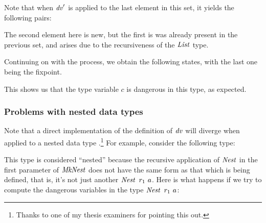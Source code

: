 Note that when $\operatorname{\mathit{dv}}'$ is applied to the last element in this set, it yields the following pairs:


The second element here is new, but the first is was already present in the previous set, and arises due to the recursiveness of the $\operatorname{\mathit{List}}$ type.

Continuing on with the process, we obtain the following states, with the last one being the fixpoint.


This shows us that the type variable $c$ is dangerous in this type, as expected.


\clearpage{}
\subsubsection{Problems with nested data types}
Note that a direct implementation of the definition of $\operatorname{\mathit{dv}}$ will diverge when applied to a nested data type \cite{bird:nested-datatypes}.\footnote{Thanks to one of my thesis examiners for pointing this out.} For example, consider the following type:


This type is considered ``nested'' because the recursive application of $\operatorname{\mathit{Nest}}$ in the first parameter of $\operatorname{\mathit{MkNest}}$ does not have the same form as that which is being defined, that is, it's not just another $\operatorname{\mathit{Nest}} \ r_1 \ a$. Here is what happens if we try to compute the dangerous variables in the type $\operatorname{\mathit{Nest}} \ r_1 \ a$:


